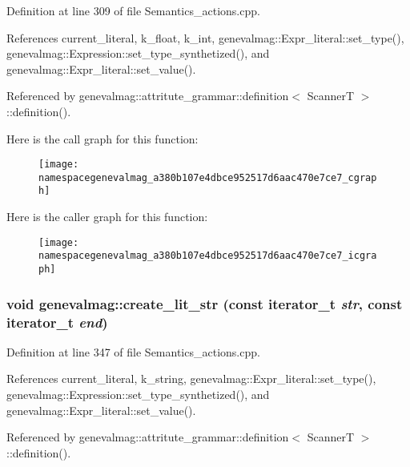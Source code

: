 Definition at line 309 of file Semantics\_\-actions.cpp.



References current\_\-literal, k\_\-float, k\_\-int, genevalmag::Expr\_\-literal::set\_\-type(), genevalmag::Expression::set\_\-type\_\-synthetized(), and genevalmag::Expr\_\-literal::set\_\-value().



Referenced by genevalmag::attritute\_\-grammar::definition$<$ ScannerT $>$::definition().



Here is the call graph for this function:\nopagebreak
\begin{figure}[H]
\begin{center}
\leavevmode
\texttt{[image: namespacegenevalmag\_a380b107e4dbce952517d6aac470e7ce7\_cgraph]}
\end{center}
\end{figure}




Here is the caller graph for this function:\nopagebreak
\begin{figure}[H]
\begin{center}
\leavevmode
\texttt{[image: namespacegenevalmag\_a380b107e4dbce952517d6aac470e7ce7\_icgraph]}
\end{center}
\end{figure}


\hypertarget{namespacegenevalmag_a474728745db913b81459a7267bb28222}{
\subsubsection[{create\_\-lit\_\-str}]{\setlength{\rightskip}{0pt plus 5cm}void genevalmag::create\_\-lit\_\-str (const iterator\_\-t {\em str}, \/  const iterator\_\-t {\em end})}}
\label{namespacegenevalmag_a474728745db913b81459a7267bb28222}


Definition at line 347 of file Semantics\_\-actions.cpp.



References current\_\-literal, k\_\-string, genevalmag::Expr\_\-literal::set\_\-type(), genevalmag::Expression::set\_\-type\_\-synthetized(), and genevalmag::Expr\_\-literal::set\_\-value().



Referenced by genevalmag::attritute\_\-grammar::definition$<$ ScannerT $>$::definition().



